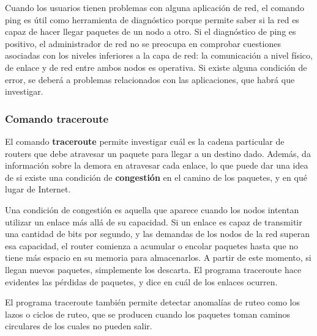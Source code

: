 \documentclass[spanish,a4paper,]{article}
\begin{document}
Cuando los usuarios tienen problemas con alguna aplicación de red, el
comando ping es útil como herramienta de diagnóstico porque permite
saber si la red es capaz de hacer llegar paquetes de un nodo a otro. Si
el diagnóstico de ping es positivo, el administrador de red no se
preocupa en comprobar cuestiones asociadas con los niveles inferiores a
la capa de red: la comunicación a nivel físico, de enlace y de red entre
ambos nodos es operativa. Si existe alguna condición de error, se deberá
a problemas relacionados con las aplicaciones, que habrá que investigar.

\hypertarget{comando-traceroute}{%
\subsubsection{Comando traceroute}\label{comando-traceroute}}

El comando \textbf{traceroute} permite investigar cuál es la cadena
particular de routers que debe atravesar un paquete para llegar a un
destino dado. Además, da información sobre la demora en atravesar cada
enlace, lo que puede dar una idea de si existe una condición de
\textbf{congestión} en el camino de los paquetes, y en qué lugar de
Internet.

Una condición de congestión es aquella que aparece cuando los nodos
intentan utilizar un enlace más allá de su capacidad. Si un enlace es
capaz de transmitir una cantidad de bits por segundo, y las demandas de
los nodos de la red superan esa capacidad, el router comienza a acumular
o encolar paquetes hasta que no tiene más espacio en su memoria para
almacenarlos. A partir de este momento, si llegan nuevos paquetes,
simplemente los descarta. El programa traceroute hace evidentes las
pérdidas de paquetes, y dice en cuál de los enlaces ocurren.

El programa traceroute también permite detectar anomalías de ruteo como
los lazos o ciclos de ruteo, que se producen cuando los paquetes toman
caminos circulares de los cuales no pueden salir.
\end{document}
